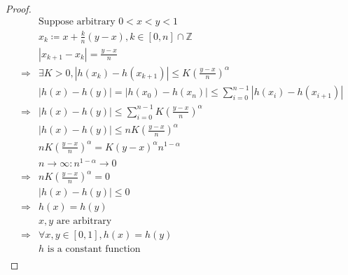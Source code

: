\documentclass{article}
\begin{document}
~

\begin{proof}
    \begin{align*}
        &\text{Suppose arbitrary }0<x<y<1\\
        &x_k\coloneqq x+\frac{k}{n}(y-x),k\in[0,n]\cap\mathbb{Z}\\
        &|x_{k+1}-x_k|=\frac{y-x}{n}\\
        \Rightarrow&\exists K>0,|h(x_k)-h(x_{k+1})|\leqslant K(\frac{y-x}{n})^\alpha\\
        &|h(x)-h(y)|=|h(x_0)-h(x_n)|\leqslant\sum^{n-1}_{i=0}|h(x_i)-h(x_{i+1})|\\
        \Rightarrow&|h(x)-h(y)|\leqslant \sum^{n-1}_{i=0}K(\frac{y-x}{n})^\alpha\\
        &|h(x)-h(y)|\leqslant nK(\frac{y-x}{n})^\alpha\\
        &nK(\frac{y-x}{n})^\alpha=K(y-x)^\alpha n^{1-\alpha}\\
        &n\to\infty:n^{1-\alpha}\to0\\
        \Rightarrow&nK(\frac{y-x}{n})^\alpha=0\\
        &|h(x)-h(y)|\leqslant0\\
        \Rightarrow&h(x)=h(y)\\
        &x,y\text{ are arbitrary}\\
        \Rightarrow&\forall x,y\in [0,1],h(x)=h(y)\\
        &h\text{ is a constant function}\\
    \end{align*}
\end{proof}
\end{document}
